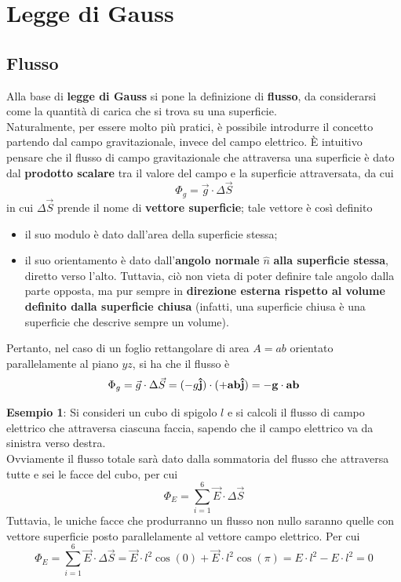 \documentclass[a4paper]{extarticle}
\begin{document}
\section{Legge di Gauss}


\vspace{1em}
\subsection{Flusso}
Alla base di \textbf{legge di Gauss} si pone la definizione di \textbf{flusso}, da considerarsi come la quantità di carica che si trova su una superficie.\\
Naturalmente, per essere molto più pratici, è possibile introdurre il concetto partendo dal campo gravitazionale, invece del campo elettrico. È intuitivo pensare che il flusso di campo gravitazionale che attraversa una superficie è dato dal \textbf{prodotto scalare} tra il valore del campo e la superficie attraversata, da cui
\[\boxed{\Phi_g = \vec g \cdot \Delta \vec S}\]
in cui $\Delta \vec S$ prende il nome di \textbf{vettore superficie}; tale vettore è così definito
\begin{itemize}
  \item il suo modulo è dato dall'area della superficie stessa;
  \item il suo orientamento è dato dall'\textbf{angolo normale} $\hat{n}$ \textbf{alla superficie stessa}, diretto verso l'alto. Tuttavia, ciò non vieta di poter definire tale angolo dalla parte opposta, ma pur sempre in \textbf{direzione esterna rispetto al volume definito dalla superficie chiusa} (infatti, una superficie chiusa è una superficie che descrive sempre un volume).
\end{itemize}
Pertanto, nel caso di un foglio rettangolare di area $A = ab$ orientato parallelamente al piano $yz$, si ha che il flusso è
\[\Phi_g = \vec g \cdot \Delta \vec S = (-g \bf{\hat j}) \cdot (+ab \bf{\hat j}) = -g \cdot ab\]

\vspace{1em}
\noindent
\textbf{Esempio 1}: Si consideri un cubo di spigolo $l$ e si calcoli il flusso di campo elettrico che attraversa ciascuna faccia, sapendo che il campo elettrico va da sinistra verso destra.\\
Ovviamente il flusso totale sarà dato dalla sommatoria del flusso che attraversa tutte e sei le facce del cubo, per cui
\[\Phi_E = \sum_{i=1}^6 \vec E \cdot \Delta \vec S\]
Tuttavia, le uniche facce che produrranno un flusso non nullo saranno quelle con vettore superficie posto parallelamente al vettore campo elettrico. Per cui
\[\Phi_E = \sum_{i=1}^6 \vec E \cdot \Delta \vec S = \vec E \cdot l^2 \cos \left(0\right) + \vec E \cdot l^2 \cos \left(\pi\right) = E \cdot l^2 - E \cdot l^2 = 0\]
\end{document}
